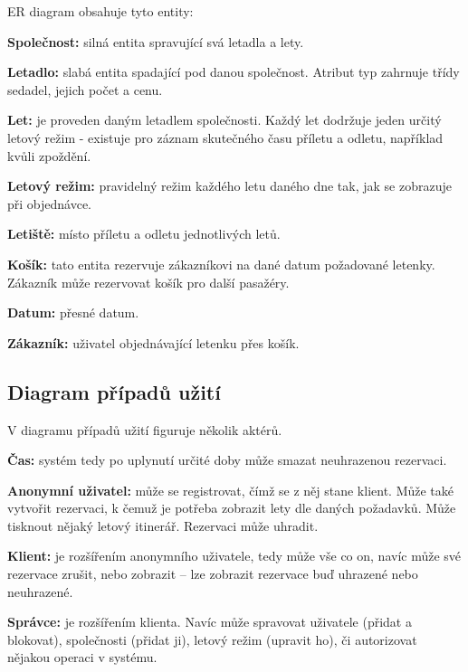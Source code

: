 \documentclass[11pt,a4paper,landscape]{article}
\begin{document}
\begin{multicols*}{2}
            ER diagram obsahuje tyto entity:

            \textbf{Společnost:} silná entita spravující svá letadla a lety.

            \textbf{Letadlo:} slabá entita spadající pod danou společnost. Atribut typ zahrnuje třídy sedadel, jejich počet a cenu.

            \textbf{Let:} je proveden daným letadlem společnosti. Každý let dodržuje jeden určitý letový režim - existuje pro záznam skutečného času příletu a odletu, například kvůli zpoždění.

            \textbf{Letový režim:} pravidelný režim každého letu daného dne tak, jak se zobrazuje při objednávce.
            
            \textbf{Letiště:} místo příletu a odletu jednotlivých letů.
            
            \textbf{Košík:} tato entita rezervuje zákazníkovi na dané datum požadované letenky. Zákazník může rezervovat košík pro další pasažéry.
            
            \textbf{Datum:} přesné datum.

            \textbf{Zákazník:} uživatel objednávající letenku přes košík.
            
             
        \subsection{Diagram případů užití}
            
            V diagramu případů užití figuruje několik aktérů.
            
            \textbf{Čas:} systém tedy po uplynutí určité doby může smazat neuhrazenou rezervaci.
            
            \textbf{Anonymní uživatel:} může se registrovat, čímž se z něj stane klient. Může také vytvořit rezervaci, k čemuž je potřeba zobrazit lety dle daných požadavků. Může tisknout nějaký letový itinerář. Rezervaci může uhradit.
            
            \textbf{Klient:} je rozšířením anonymního uživatele, tedy může vše co on, navíc může své rezervace zrušit, nebo zobrazit – lze zobrazit rezervace buď uhrazené nebo neuhrazené.
            
            \textbf{Správce:} je rozšířením klienta. Navíc může spravovat uživatele (přidat a blokovat), společnosti (přidat ji), letový režim (upravit ho), či autorizovat nějakou operaci v systému.
            
\end{multicols*}
\end{document}
